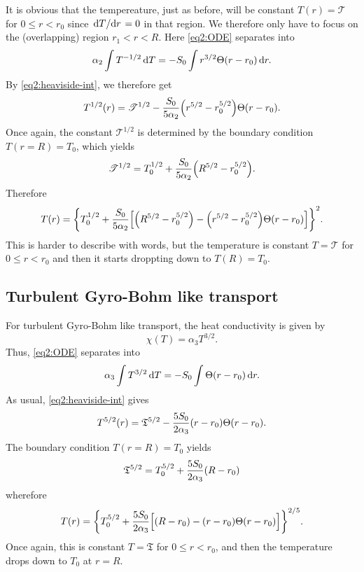 \documentclass[11pt,a4paper, 
swedish, english %
]{article}
\begin{document}
It is obvious that the tempereature, just as before, will be constant
$T(r)=\mathscr{T}$ for $0\le r<r_0$ since $\dv*{T}{r}=0$ in that region. We
therefore only have to focus on the (overlapping) region
$r_1<r<R$. Here \eqref{eq2:ODE} 
separates into
\begin{equation}
\alpha_2\int T^{-1/2}\id{T}=-S_0\int r^{3/2}\Theta(r-r_0) \id{r}.
\end{equation}
By \eqref{eq2:heaviside-int}, we therefore get
\begin{equation}
T^{1/2}(r)=\mathscr{T}^{1/2}
-\frac{S_0}{5\alpha_2}\qty(r^{5/2}-r_0^{5/2})\Theta(r-r_0).
\end{equation}
Once again, the constant $\mathscr{T}^{1/2}$ is determined by the boundary
condition $T(r=R)=T_0$, which yields
\begin{equation}
\mathscr{T}^{1/2}=T_0^{1/2}+
\frac{S_0}{5\alpha_2}\qty(R^{5/2}-r_0^{5/2}).
\end{equation}
Therefore
\begin{equation}
T(r)=\qty{T_0^{1/2}+\frac{S_0}{5\alpha_2}
\qty[\qty(R^{5/2}-r_0^{5/2})-\qty(r^{5/2}-r_0^{5/2})\Theta(r-r_0)]}^2.
\end{equation}
This is harder to describe with words, but the temperature is constant
$T=\mathscr{T}$ for $0\le r<r_0$ and then it starts droppting down to
$T(R)=T_0$. 

\subsection{Turbulent Gyro-Bohm like transport}
For turbulent Gyro-Bohm like transport, the heat conductivity is given
by
\begin{equation}
\chi(T)=\alpha_3 T^{3/2}.
\end{equation}
Thus, \eqref{eq2:ODE} separates into
\begin{equation}
\alpha_3\int T^{3/2}\id{T}=-S_0\int \Theta(r-r_0) \id{r}.
\end{equation}
As usual, \eqref{eq2:heaviside-int} gives
\begin{equation}
T^{5/2}(r)=\mathfrak{T}^{5/2}
-\frac{5S_0}{2\alpha_3}\qty(r-r_0)\Theta(r-r_0).
\end{equation}
The boundary condition $T(r=R)=T_0$ yields
\begin{equation}
\mathfrak{T}^{5/2}=T_0^{5/2}+
\frac{5S_0}{2\alpha_3}\qty(R-r_0)
\end{equation}
wherefore
\begin{equation}
T(r)=\qty{T_0^{5/2}+\frac{5S_0}{2\alpha_3}
\Big[(R-r_0)-(r-r_0)\Theta(r-r_0)\Big]}^{2/5}.
\end{equation}
Once again, this is constant $T=\mathfrak{T}$ for $0\le r<r_0$, and
then the temperature drops down to $T_0$ at $r=R$.
\end{document}
